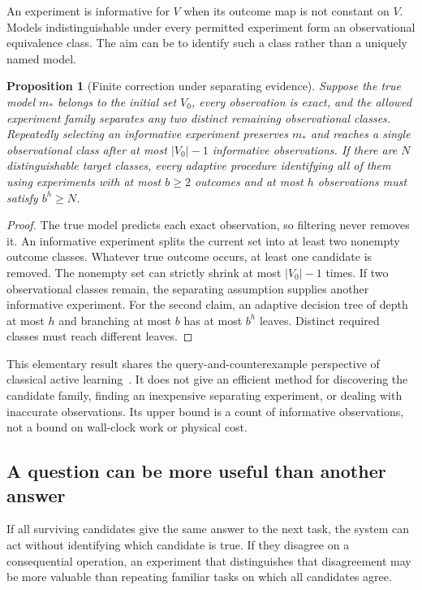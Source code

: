 \documentclass[11pt,letterpaper]{article}
\theoremstyle{plain}
\newtheorem{proposition}[theorem]{Proposition}
\theoremstyle{definition}
\begin{document}
An experiment is informative for $V$ when its outcome map is not constant on $V$. Models indistinguishable under every permitted experiment form an observational equivalence class. The aim can be to identify such a class rather than a uniquely named model.

\begin{proposition}[Finite correction under separating evidence]\label{prop:queries}
Suppose the true model $m_*$ belongs to the initial set $V_0$, every observation is exact, and the allowed experiment family separates any two distinct remaining observational classes. Repeatedly selecting an informative experiment preserves $m_*$ and reaches a single observational class after at most $|V_0|-1$ informative observations. If there are $N$ distinguishable target classes, every adaptive procedure identifying all of them using experiments with at most $b\geq2$ outcomes and at most $h$ observations must satisfy $b^h\geq N$.
\end{proposition}
\begin{proof}
The true model predicts each exact observation, so filtering never removes it. An informative experiment splits the current set into at least two nonempty outcome classes. Whatever true outcome occurs, at least one candidate is removed. The nonempty set can strictly shrink at most $|V_0|-1$ times. If two observational classes remain, the separating assumption supplies another informative experiment. For the second claim, an adaptive decision tree of depth at most $h$ and branching at most $b$ has at most $b^h$ leaves. Distinct required classes must reach different leaves.
\end{proof}
This elementary result shares the query-and-counterexample perspective of classical active learning~\cite{angluin}. It does not give an efficient method for discovering the candidate family, finding an inexpensive separating experiment, or dealing with inaccurate observations. Its upper bound is a count of informative observations, not a bound on wall-clock work or physical cost.

\subsection{A question can be more useful than another answer}
If all surviving candidates give the same answer to the next task, the system can act without identifying which candidate is true. If they disagree on a consequential operation, an experiment that distinguishes that disagreement may be more valuable than repeating familiar tasks on which all candidates agree.
\end{document}
